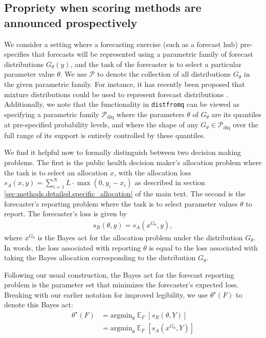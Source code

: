 \documentclass{article}
\DeclareMathOperator{\Ex}{\mathbb{E}}
\begin{document}
\subsection{Propriety when scoring methods are announced prospectively}

We consider a setting where a forecasting exercise (such as a forecast hub) pre-specifies that forecasts will be represented using a parametric family of forecast distributions $G_\theta(y)$, and the task of the forecaster is to select a particular parameter value $\theta$. We use $\mathcal{P}$ to denote the collection of all distributions $G_\theta$ in the given parametric family. For instance, it has recently been proposed that mixture distributions could be used to represent forecast distributions \citep{wadsworth2023mixture}. Additionally, we note that the functionality in \verb`distfromq` can be viewed as specifying a parametric family $\mathcal{P}_{\mathrm{dfq}}$ where the parameters $\theta$ of $G_\theta$
are its quantiles at pre-specified probability levels, and where the shape of any $G_\theta \in \mathcal{P}_{\mathrm{dfq}}$ over the full range of its support is entirely controlled by these quantiles.

We find it helpful now to formally distinguish between two decision making problems. The first is the public health decision maker's allocation problem where the task is to select an allocation $x$, with the allocation loss $s_A(x, y) = \sum_{i=1}^N L \cdot \max(0, y_i - x_i)$ as described in section \ref{sec:methods.detailed.specific_allocation} of the main text.
The second is the forecaster's reporting problem where the task is to select parameter values $\theta$ to report. The forecaster's loss is given by
\begin{align}
s_R(\theta, y) = s_A(x^{G_\theta}, y), \label{eqn:forecaster_theta_loss}
\end{align}
where $x^{G_\theta}$ is the Bayes act for the allocation problem under the distribution $G_\theta$. In words, the loss associated with reporting $\theta$ is equal to the loss associated with taking the Bayes allocation corresponding to the distribution $G_\theta$.

Following our usual construction, the Bayes act for the forecast reporting problem is the parameter set that minimizes the forecaster's expected loss. Breaking with our earlier notation for improved legibility, we use $\theta^\star(F)$ to denote this Bayes act:
\begin{align*}
\theta^\star(F) &= \text{argmin}_\theta \Ex_F [s_R(\theta, Y)] \\
&= \text{argmin}_\theta \Ex_F [s_A(x^{G_\theta}, Y)]
\end{align*}
\end{document}
